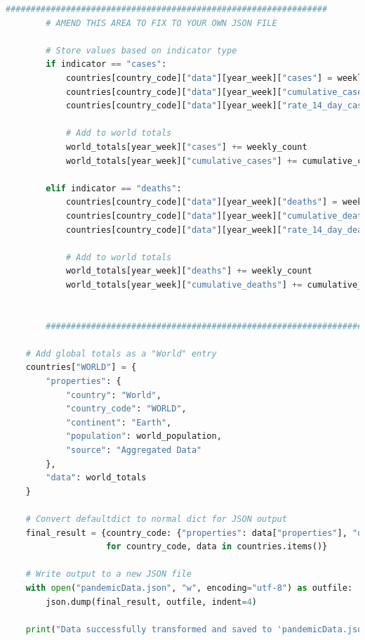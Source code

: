\documentclass{report}
\begin{document}
\begin{lstlisting}[language=Python]
        ################################################################
        # AMEND THIS AREA TO FIX TO YOUR OWN JSON FILE
        
        # Store values based on indicator type
        if indicator == "cases":
            countries[country_code]["data"][year_week]["cases"] = weekly_count
            countries[country_code]["data"][year_week]["cumulative_cases"] = cumulative_count
            countries[country_code]["data"][year_week]["rate_14_day_cases"] = rate_14_day
    
            # Add to world totals
            world_totals[year_week]["cases"] += weekly_count
            world_totals[year_week]["cumulative_cases"] += cumulative_count
    
        elif indicator == "deaths":
            countries[country_code]["data"][year_week]["deaths"] = weekly_count
            countries[country_code]["data"][year_week]["cumulative_deaths"] = cumulative_count
            countries[country_code]["data"][year_week]["rate_14_day_deaths"] = rate_14_day
    
            # Add to world totals
            world_totals[year_week]["deaths"] += weekly_count
            world_totals[year_week]["cumulative_deaths"] += cumulative_count
    
    
        ################################################################
            
    # Add global totals as a "World" entry
    countries["WORLD"] = {
        "properties": {
            "country": "World",
            "country_code": "WORLD",
            "continent": "Earth",
            "population": world_population,
            "source": "Aggregated Data"
        },
        "data": world_totals
    }
    
    # Convert defaultdict to normal dict for JSON output
    final_result = {country_code: {"properties": data["properties"], "data": dict(data["data"])} 
                    for country_code, data in countries.items()}
    
    # Write output to a new JSON file
    with open("pandemicData.json", "w", encoding="utf-8") as outfile:
        json.dump(final_result, outfile, indent=4)
    
    print("Data successfully transformed and saved to 'pandemicData.json'")
\end{lstlisting}
\newpage
\end{document}
